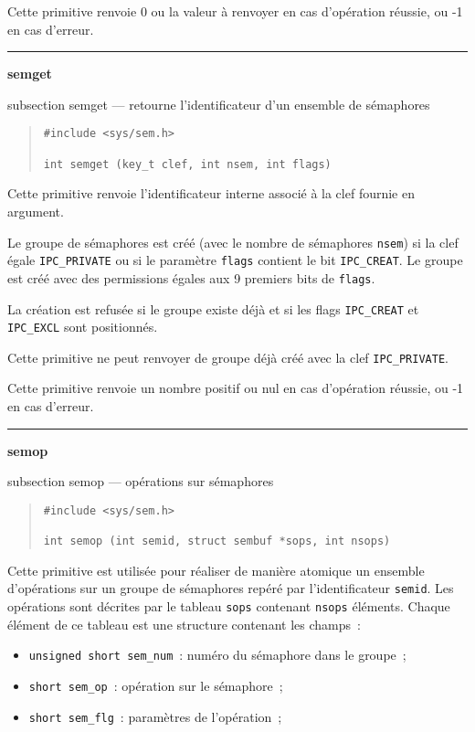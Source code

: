 \documentclass [twoside] {report}
\newcommand {\primitive} [1]
    {
	\phantomsection
	{\large \textbf {#1}}
	\addcontentsline {toc} {subsection} {#1}
    }
\newcommand {\separation}
    {
	\vspace {5mm}
	\nopagebreak
	\hrule
    }
\begin{document}
Cette primitive renvoie 0 ou la valeur à renvoyer en cas d'opération
réussie, ou -1 en cas d'erreur.


\separation
\primitive {semget} --- retourne l'identificateur d'un ensemble de sémaphores

\begin {quote}
\begin {verbatim}
#include <sys/sem.h>

int semget (key_t clef, int nsem, int flags)
\end{verbatim}
\end {quote}

Cette primitive renvoie l'identificateur interne associé à la clef
fournie en argument.

Le groupe de sémaphores est créé (avec le nombre de sémaphores
\texttt {nsem}) si la clef égale \texttt {IPC\_PRIVATE} ou si le paramètre
\texttt {flags} contient le bit \texttt {IPC\_CREAT}.  Le groupe est créé avec des
permissions égales aux 9 premiers bits de \texttt {flags}.

La création est refusée si le groupe existe déjà et si les flags
\texttt {IPC\_CREAT} et \texttt {IPC\_EXCL} sont positionnés.

Cette primitive ne peut renvoyer de groupe déjà créé avec la clef
\texttt {IPC\_PRIVATE}.

Cette primitive renvoie un nombre positif ou nul en cas d'opération
réussie, ou -1 en cas d'erreur.


\separation
\primitive {semop} --- opérations sur sémaphores

\begin {quote}
\begin {verbatim}
#include <sys/sem.h>

int semop (int semid, struct sembuf *sops, int nsops)
\end{verbatim}
\end {quote}

Cette primitive est utilisée pour réaliser de manière atomique
un ensemble d'opérations sur un groupe de sémaphores repéré par
l'identificateur \texttt {semid}. Les opérations sont décrites par
le tableau \texttt {sops} contenant \texttt {nsops} éléments. Chaque
élément de ce tableau est une structure contenant les champs~:

\begin {itemize}
    \item \texttt {unsigned short sem\_num}~: numéro du sémaphore
	dans le groupe~;
    \item \texttt {short sem\_op}~: opération sur le sémaphore~;
    \item \texttt {short sem\_flg}~: paramètres de l'opération~;
\end {itemize}
\end{document}
